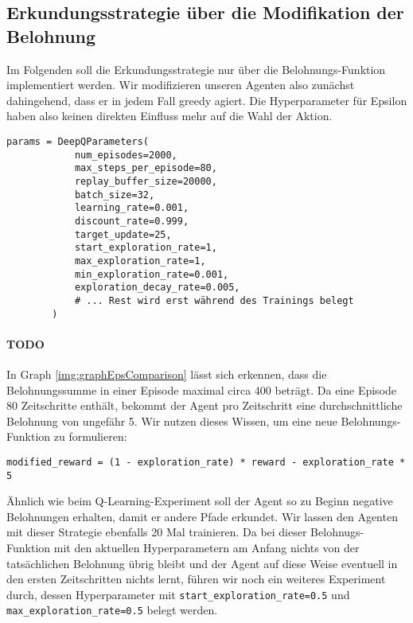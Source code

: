 \subsection{Erkundungsstrategie über die Modifikation der Belohnung} \label{sec:deepQRewardModification}
Im Folgenden soll die Erkundungsstrategie nur über die Belohnungs-Funktion implementiert werden. Wir modifizieren unseren Agenten also zunächst dahingehend, dass er in jedem Fall greedy agiert. Die Hyperparameter für Epsilon haben also keinen direkten Einfluss mehr auf die Wahl der Aktion.
\begin{verbatim}
params = DeepQParameters(
            num_episodes=2000,
            max_steps_per_episode=80,
            replay_buffer_size=20000,
            batch_size=32,
            learning_rate=0.001,
            discount_rate=0.999,
            target_update=25,
            start_exploration_rate=1,
            max_exploration_rate=1,
            min_exploration_rate=0.001,
            exploration_decay_rate=0.005,
            # ... Rest wird erst während des Trainings belegt
        )
\end{verbatim}

\paragraph{TODO}
In Graph \ref{img:graphEpsComparison} lässt sich erkennen, dass die Belohnungssumme in einer Episode maximal circa 400 beträgt. Da eine Episode 80 Zeitschritte enthält, bekommt der Agent pro Zeitschritt eine durchschnittliche Belohnung von ungefähr 5. Wir nutzen dieses Wissen, um eine neue Belohnungs-Funktion zu formulieren:
\begin{verbatim}
modified_reward = (1 - exploration_rate) * reward - exploration_rate * 5
\end{verbatim}
Ähnlich wie beim Q-Learning-Experiment soll der Agent so zu Beginn negative Belohnungen erhalten, damit er andere Pfade erkundet. Wir lassen den Agenten mit dieser Strategie ebenfalls 20 Mal trainieren. Da bei dieser Belohnugs-Funktion mit den aktuellen Hyperparametern am Anfang nichts von der tatsächlichen Belohnung übrig bleibt und der Agent auf diese Weise eventuell in den ersten Zeitschritten nichts lernt, führen wir noch ein weiteres Experiment durch, dessen Hyperparameter mit \texttt{start_exploration_rate=0.5} und \texttt{max_exploration_rate=0.5} belegt werden.

